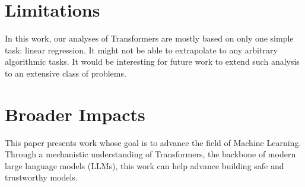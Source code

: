 \documentclass[11pt]{article}
\theoremstyle{plain}
\theoremstyle{definition}
\theoremstyle{remark}
\renewcommand{\^}[1]{^{(#1)}}
\begin{document}
\section{Limitations} \label{sec:limitations}
In this work, our analyses of Transformers are mostly based on only one simple task: linear regression. It might not be able to extrapolate to any arbitrary algorithmic tasks. It would be interesting for future work to extend such analysis to an extensive class of problems. 

\section{Broader Impacts} \label{sec:impacts}
This paper presents work whose goal is to advance the field of Machine Learning. Through a mechanistic understanding of Transformers, the backbone of modern large language models (LLMs), this work can help advance building safe and trustworthy models.

\newpage
\end{document}
